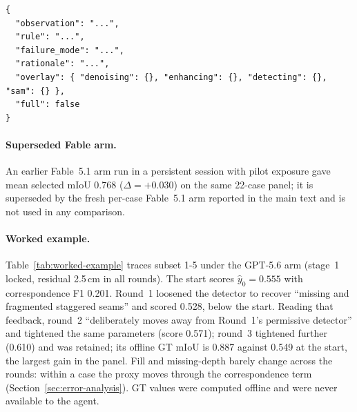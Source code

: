 \documentclass[a4paper,fleqn]{cas-dc}
\begin{document}
\begin{lstlisting}[caption={Required proposal schema (per attempt).},label={lst:prompt-skeleton}]
{
  "observation": "...",
  "rule": "...",
  "failure_mode": "...",
  "rationale": "...",
  "overlay": { "denoising": {}, "enhancing": {}, "detecting": {}, "sam": {} },
  "full": false
}
\end{lstlisting}

\paragraph{Superseded Fable arm.}
An earlier Fable~5.1 arm run in a persistent session with pilot exposure gave mean selected mIoU 0.768 ($\Delta=+0.030$) on the same 22-case panel; it is superseded by the fresh per-case Fable~5.1 arm reported in the main text and is not used in any comparison.

\paragraph{Worked example.}
Table~\ref{tab:worked-example} traces subset 1-5 under the GPT-5.6 arm (stage~1 locked, residual 2.5\,cm in all rounds). The start scores $\hat y_0=0.555$ with correspondence F1 0.201. Round~1 loosened the detector to recover ``missing and fragmented staggered seams'' and scored 0.528, below the start. Reading that feedback, round~2 ``deliberately moves away from Round~1's permissive detector'' and tightened the same parameters (score 0.571); round~3 tightened further (0.610) and was retained; its offline GT mIoU is 0.887 against 0.549 at the start, the largest gain in the panel. Fill and missing-depth barely change across the rounds: within a case the proxy moves through the correspondence term (Section~\ref{sec:error-analysis}). GT values were computed offline and were never available to the agent.
\end{document}
